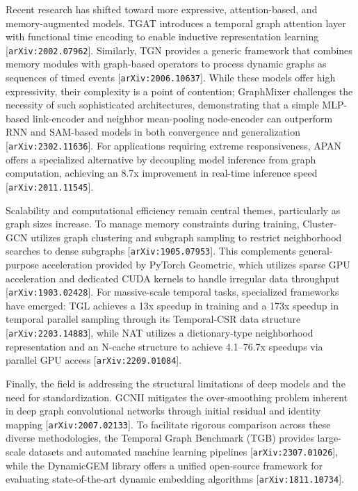 \documentclass[11pt]{article}
\begin{document}
Recent research has shifted toward more expressive, attention-based, and memory-augmented models. TGAT introduces a temporal graph attention layer with functional time encoding to enable inductive representation learning [\texttt{arXiv:2002.07962}]. Similarly, TGN provides a generic framework that combines memory modules with graph-based operators to process dynamic graphs as sequences of timed events [\texttt{arXiv:2006.10637}]. While these models offer high expressivity, their complexity is a point of contention; GraphMixer challenges the necessity of such sophisticated architectures, demonstrating that a simple MLP-based link-encoder and neighbor mean-pooling node-encoder can outperform RNN and SAM-based models in both convergence and generalization [\texttt{arXiv:2302.11636}]. For applications requiring extreme responsiveness, APAN offers a specialized alternative by decoupling model inference from graph computation, achieving an 8.7x improvement in real-time inference speed [\texttt{arXiv:2011.11545}].

Scalability and computational efficiency remain central themes, particularly as graph sizes increase. To manage memory constraints during training, Cluster-GCN utilizes graph clustering and subgraph sampling to restrict neighborhood searches to dense subgraphs [\texttt{arXiv:1905.07953}]. This complements general-purpose acceleration provided by PyTorch Geometric, which utilizes sparse GPU acceleration and dedicated CUDA kernels to handle irregular data throughput [\texttt{arXiv:1903.02428}]. For massive-scale temporal tasks, specialized frameworks have emerged: TGL achieves a 13x speedup in training and a 173x speedup in temporal parallel sampling through its Temporal-CSR data structure [\texttt{arXiv:2203.14883}], while NAT utilizes a dictionary-type neighborhood representation and an N-cache structure to achieve 4.1–76.7x speedups via parallel GPU access [\texttt{arXiv:2209.01084}].

Finally, the field is addressing the structural limitations of deep models and the need for standardization. GCNII mitigates the over-smoothing problem inherent in deep graph convolutional networks through initial residual and identity mapping [\texttt{arXiv:2007.02133}]. To facilitate rigorous comparison across these diverse methodologies, the Temporal Graph Benchmark (TGB) provides large-scale datasets and automated machine learning pipelines [\texttt{arXiv:2307.01026}], while the DynamicGEM library offers a unified open-source framework for evaluating state-of-the-art dynamic embedding algorithms [\texttt{arXiv:1811.10734}].
\end{document}
